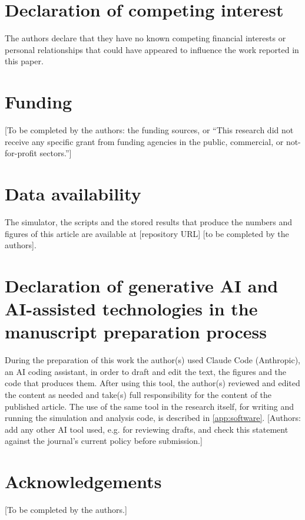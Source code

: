 \documentclass[preprint,12pt]{elsarticle}
\begin{document}
\section*{Declaration of competing interest}
The authors declare that they have no known competing financial interests or personal relationships that could have appeared to influence the work reported in this paper.

\section*{Funding}
[To be completed by the authors: the funding sources, or ``This research did not receive any specific grant from funding agencies in the public, commercial, or not-for-profit sectors.'']

\section*{Data availability}
The simulator, the scripts and the stored results that produce the numbers and figures of this article are available at [repository URL] [to be completed by the authors].

\section*{Declaration of generative AI and AI-assisted technologies in the manuscript preparation process}
During the preparation of this work the author(s) used Claude Code (Anthropic), an AI coding assistant, in order to draft and edit the text, the figures and the code that produces them. After using this tool, the author(s) reviewed and edited the content as needed and take(s) full responsibility for the content of the published article. The use of the same tool in the research itself, for writing and running the simulation and analysis code, is described in \ref{app:software}. [Authors: add any other AI tool used, e.g. for reviewing drafts, and check this statement against the journal's current policy before submission.]

\section*{Acknowledgements}
[To be completed by the authors.]

\appendix
\setcounter{table}{0}
\renewcommand{\theHtable}{\thetable}






\end{document}
